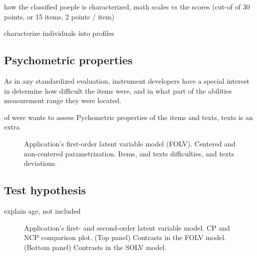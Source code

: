 how the classified poeple is characterized, math scales vs the scores (cut-of of 30 points, or 15 items, 2 points / item)

characterize individuals into profiles 


\subsection{Psychometric properties}

As in any standardized evaluation, instrument developers have a special interest in determine how difficult the items were, and in what part of the abilities measurement range they were located.

of were wants to assess  Pychometric properties of the items and texts, texts is an extra
%
\begin{figure}[H]
	\centering
	\begin{subfigure}
		\texttt{[image: FOLV\_recovery\_items]}
	\end{subfigure}
	\begin{subfigure}
		\texttt{[image: FOLV\_recovery\_texts]}
	\end{subfigure}
	\caption[Application's first-order latent variable model (FOLV). Centered and non-centered parametrization. Items, and texts difficulties, and texts deviations.]%
	{Application's first-order latent variable model (FOLV). Centered and non-centered parametrization. Items, and texts difficulties, and texts deviations.}
	\label{fig:FOLV_CE.NC_recovery}
\end{figure}



\subsection{Test hypothesis} \label{sect:test_hypothesis}

explain age, not included
%
\begin{figure}[H]
	\centering
	\begin{subfigure}
		\texttt{[image: FOLV\_recovery\_contrast]}
	\end{subfigure}
	\begin{subfigure}
		\texttt{[image: SOLV\_recovery\_contrast]}
	\end{subfigure}
%
	\caption[Application's first- and second-order latent variable model. CP and NCP comparison plot.]%
	{Application's first- and second-order latent variable model. CP and NCP comparison plot. (Top panel) Contrasts in the FOLV model. (Bottom panel) Contrasts in the SOLV model. }
	\label{fig:contrast_both}
\end{figure}






